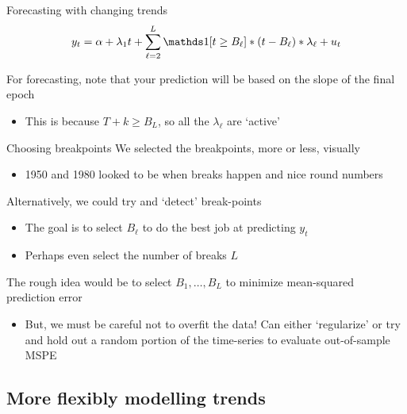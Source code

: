 \documentclass[aspectratio=169,t,11pt,table]{beamer}
\begin{document}

\begin{frame}{Forecasting with changing trends}
  \vspace*{-\bigskipamount}
  $$
    y_t = \alpha + \lambda_1 t + \sum_{\ell = 2}^L \one{t \geq B_\ell} * (t - B_\ell) * \lambda_\ell + u_t
  $$
  
  \bigskip
  For forecasting, note that your prediction will be based on the slope of the final epoch
  \begin{itemize}
    \item This is because $T + k \geq B_L$, so all the $\lambda_\ell$ are `active'
  \end{itemize}
\end{frame}

\begin{frame}{Choosing breakpoints}
  We selected the breakpoints, more or less, visually
  \begin{itemize}
    \item 1950 and 1980 looked to be when breaks happen and nice round numbers
  \end{itemize}

  \pause
  \bigskip
  Alternatively, we could try and `detect' break-points
  \begin{itemize}
    \item The goal is to select $B_\ell$ to do the best job at predicting $y_t$
    \item Perhaps even select the number of breaks $L$
  \end{itemize}

  \pause
  \bigskip
  The rough idea would be to select $B_1, \dots, B_L$ to minimize mean-squared prediction error
  \begin{itemize}
    \item But, we must be careful not to overfit the data! Can either `regularize' or try and hold out a random portion of the time-series to evaluate out-of-sample MSPE
  \end{itemize} 
\end{frame}



\subsection{More flexibly modelling trends}
\end{document}
